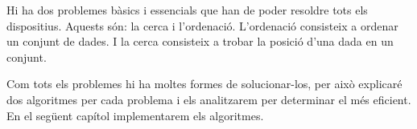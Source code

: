 





Hi ha dos problemes bàsics i essencials que han de poder resoldre tots els dispositius. Aquests són: la cerca i l'ordenació. L'ordenació consisteix a ordenar un conjunt de dades. I la cerca consisteix a trobar la posició d'una dada en un conjunt.

Com tots els problemes hi ha moltes formes de solucionar-los, per això explicaré dos algoritmes per cada problema i els analitzarem per determinar el més eficient. En el següent capítol implementarem els algoritmes.

